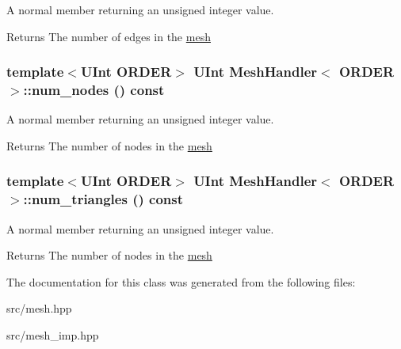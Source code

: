 A normal member returning an unsigned integer value. \begin{DoxyReturn}{Returns}
The number of edges in the \hyperlink{structmesh}{mesh} 
\end{DoxyReturn}
\hypertarget{classMeshHandler_aad0e450b97d6cf690d31b850524e7cda}{
\subsubsection[{num\_\-nodes}]{\setlength{\rightskip}{0pt plus 5cm}template$<$UInt ORDER$>$ UInt {\bf MeshHandler}$<$ ORDER $>$::num\_\-nodes () const}}
\label{classMeshHandler_aad0e450b97d6cf690d31b850524e7cda}


A normal member returning an unsigned integer value. \begin{DoxyReturn}{Returns}
The number of nodes in the \hyperlink{structmesh}{mesh} 
\end{DoxyReturn}
\hypertarget{classMeshHandler_a8c6a559cb5b5024d591c1edaa560a111}{
\subsubsection[{num\_\-triangles}]{\setlength{\rightskip}{0pt plus 5cm}template$<$UInt ORDER$>$ UInt {\bf MeshHandler}$<$ ORDER $>$::num\_\-triangles () const}}
\label{classMeshHandler_a8c6a559cb5b5024d591c1edaa560a111}


A normal member returning an unsigned integer value. \begin{DoxyReturn}{Returns}
The number of nodes in the \hyperlink{structmesh}{mesh} 
\end{DoxyReturn}


The documentation for this class was generated from the following files:\begin{DoxyCompactItemize}
\item 
src/mesh.hpp\item 
src/mesh\_\-imp.hpp\end{DoxyCompactItemize}
